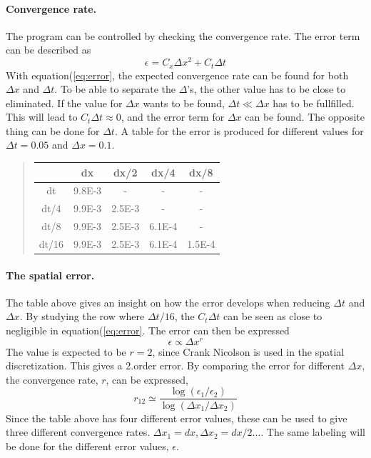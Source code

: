 \documentclass[%
twoside,                 %
final,                   %
10pt]{article}
\begin{document}
\paragraph{Convergence rate.}
The program can be controlled by checking the convergence rate. The error term can be described as  
\begin{equation} \label{eq:error}
    \epsilon = C_x\Delta x^2 + C_t \Delta t
\end{equation}
With equation(\ref{eq:error}, the expected convergence rate can be found for both $\Delta x$ and $\Delta t$. To be able to separate the $\Delta$'s, the other value has to be close to eliminated. If the value for $\Delta x$ wants to be found,  $\Delta t \ll \Delta x$ has to be fullfilled. This will lead to $C_t\Delta t \approx 0$, and the error term for $\Delta x$ can be found. The opposite thing can  be done for $\Delta t$. A table for the error is produced for different values for $\Delta t = 0.05$ and $\Delta x=0.1$.


\begin{quote}
\begin{tabular}{ccccc}
\hline
\multicolumn{1}{c}{  } & \multicolumn{1}{c}{ dx } & \multicolumn{1}{c}{ dx/2 } & \multicolumn{1}{c}{ dx/4 } & \multicolumn{1}{c}{ dx/8 } \\
\hline
dt     & 9.8E-3 & -      & -      & -      \\
dt/4   & 9.9E-3 & 2.5E-3 & -      & -      \\
dt/8   & 9.9E-3 & 2.5E-3 & 6.1E-4 & -      \\
dt/16  & 9.9E-3 & 2.5E-3 & 6.1E-4 & 1.5E-4 \\
\hline
\end{tabular}
\end{quote}

\noindent

\paragraph{The spatial error.}
The table above gives an insight on how the error develops when reducing $\Delta t$ and $\Delta x$. By studying the row where $\Delta t/16$, the $C_t \Delta t$ can be seen as close to negligible in equation(\ref{eq:error}. The error can then be expressed 
\begin{equation}
    \epsilon \propto \Delta x^r
\end{equation}
The value is expected to be $r=2$, since Crank Nicolson is used in the spatial discretization. This gives a 2.order error. By comparing the error for different $\Delta x$, the convergence rate, $r$, can be expressed, 
\begin{equation} \label{eq:conv_rate}
 r_{12} \simeq \frac{\log(\epsilon_1/\epsilon_2)}{\log(\Delta x_1/\Delta x_2)}
\end{equation}
Since the table above has four different error values, these can be used to give three different convergence rates. $\Delta x_1 = dx, \Delta x_2 = dx/2...$. The same labeling will be done for the different error values, $\epsilon$.
\end{document}
